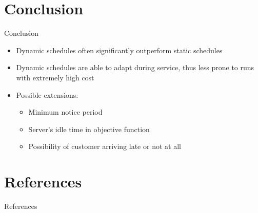 \documentclass{beamer}
\begin{document}
\section{Conclusion}

\begin{frame}{Conclusion}
	\begin{itemize}
		\item Dynamic schedules often significantly outperform static schedules
		\item Dynamic schedules are able to adapt during service, thus less prone to runs with extremely high cost
		\item Possible extensions:
		\begin{itemize}
			\item Minimum notice period
			\item Server's idle time in objective function
			\item Possibility of customer arriving late or not at all
		\end{itemize}
	\end{itemize}
\end{frame}

\appendix

\section{References}

\begin{frame}[allowframebreaks]{References}
	\printbibliography[heading=none]
\end{frame}
\end{document}
